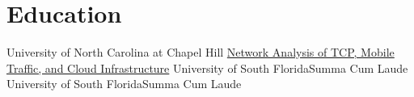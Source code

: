 \section{Education}
		{University of North Carolina at Chapel Hill}
		{}{}
		{\href{https://dinatale2.github.io/files/masters_paper.pdf}
		{Network Analysis of TCP, Mobile Traffic, and Cloud Infrastructure}}
		{University of South Florida}{Summa Cum Laude}{}{}
		{University of South Florida}{Summa Cum Laude}{}{}
